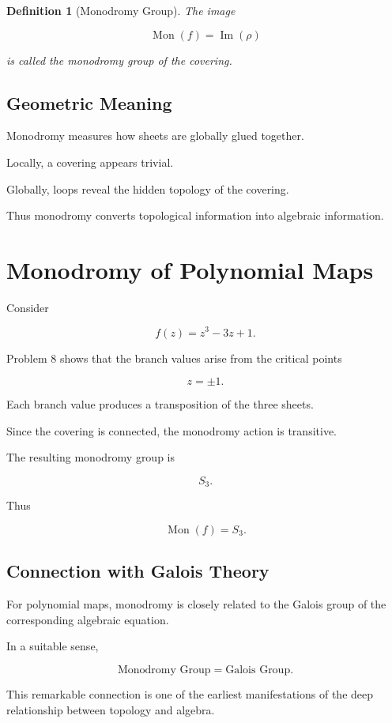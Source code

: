 \documentclass[12pt,a4paper]{article}
\theoremstyle{notespace}
\newtheorem{definition}{Definition}[subsection]
\begin{document}
\begin{definition}[Monodromy Group]
	The image
	
	\[
	\operatorname{Mon}(f)
	=
	\operatorname{Im}(\rho)
	\]
	
	is called the monodromy group of the covering.
\end{definition}

\subsection{Geometric Meaning}

Monodromy measures how sheets are globally glued together.

Locally, a covering appears trivial.

Globally, loops reveal the hidden topology of the covering.

Thus monodromy converts topological information into algebraic
information.

\section{Monodromy of Polynomial Maps}

Consider

\[
f(z)=z^3-3z+1.
\]

Problem 8 shows that the branch values arise from the critical points

\[
z=\pm 1.
\]

Each branch value produces a transposition of the three sheets.

Since the covering is connected, the monodromy action is transitive.

The resulting monodromy group is

\[
S_3.
\]

Thus

\[
\boxed{
	\operatorname{Mon}(f)=S_3.
}
\]

\subsection{Connection with Galois Theory}

For polynomial maps, monodromy is closely related to the Galois group of
the corresponding algebraic equation.

In a suitable sense,

\[
\boxed{
	\text{Monodromy Group}
	=
	\text{Galois Group}.
}
\]

This remarkable connection is one of the earliest manifestations of the
deep relationship between topology and algebra.
\end{document}

